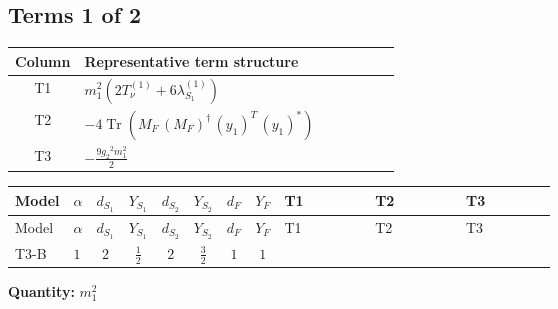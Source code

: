 \documentclass[8pt]{article}
\begin{document}
\begin{landscape}
\subsection*{Terms 1 of 2}
\begin{center}
\begin{tabular}{@{}c >{\raggedright\arraybackslash}p{0.82\linewidth}@{}}
\toprule
Column & Representative term structure \\
\midrule
T1 & \(\displaystyle {m_1^2} (2 T_{\nu}^{(1)}+6 {\lambda_{S_1}^{(1)}})\) \\
\midrule
T2 & \(\displaystyle -4 \operatorname{Tr}\!\left({M_F}\,\left({M_F}\right)^{\dagger}\,\left({y_1}\right)^{T}\,\left({y_1}\right)^{*}\right)\) \\
\midrule
T3 & \(\displaystyle -\frac{9 {g_2}^2 {m_1^2}}{2}\) \\
\midrule
\bottomrule
\end{tabular}
\end{center}
\smallskip
\tiny
\begin{longtable}{@{}llcccccc >{\raggedright\arraybackslash}p{0.21\linewidth} >{\raggedright\arraybackslash}p{0.21\linewidth} >{\raggedright\arraybackslash}p{0.21\linewidth}@{}}
\toprule
Model & $\alpha$ & $d_{S_1}$ & $Y_{S_1}$ & $d_{S_2}$ & $Y_{S_2}$ & $d_F$ & $Y_F$ & T1 & T2 & T3 \\
\midrule
\endfirsthead
\toprule
Model & $\alpha$ & $d_{S_1}$ & $Y_{S_1}$ & $d_{S_2}$ & $Y_{S_2}$ & $d_F$ & $Y_F$ & T1 & T2 & T3 \\
\midrule
\endhead
T3-B & $1$ & $2$ & $\frac{1}{2}$ & $2$ & $\frac{3}{2}$ & $1$ & $1$ & \scriptsize\adjustbox{max width=\linewidth}{$\begin{gathered} {m_1^2} (2 T_{\nu}^{(1)}+6 {\lambda_{S_1}^{(1)}})\end{gathered}$} & \scriptsize\adjustbox{max width=\linewidth}{$\begin{gathered} -4 \operatorname{Tr}\!\left({M_F}\,\left({M_F}\right)^{\dagger}\,\left({y_1}\right)^{T}\,\left({y_1}\right)^{*}\right)\end{gathered}$} & \scriptsize\adjustbox{max width=\linewidth}{$\begin{gathered} -\frac{9 {g_2}^2 {m_1^2}}{2}\end{gathered}$} \\
\midrule
\bottomrule
\end{longtable}
\clearpage
\noindent\textbf{Quantity: }$m_1^2$\par\smallskip

\end{landscape}
\end{document}

